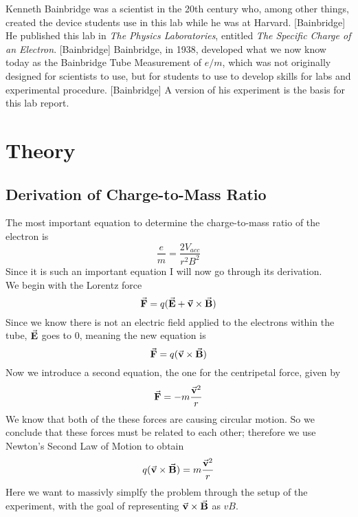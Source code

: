 \documentclass[aps,prl,10pt,twocolumn,floatfix]{revtex4-2}
\begin{document}
Kenneth Bainbridge was a scientist in the 20th century who, among other things, created the device students use in this lab while he was at Harvard. [Bainbridge]
He published this lab in \textit{The Physics Laboratories}, entitled \textit{The Specific Charge of an Electron}. [Bainbridge]
Bainbridge, in 1938, developed what we now know today as the Bainbridge Tube Measurement of $e/m$, which was not originally designed for scientists to use, but for students to use to develop skills for labs and experimental procedure. [Bainbridge]
A version of his experiment is the basis for this lab report.


\section{Theory}\label{Theory}
\subsection{Derivation of Charge-to-Mass Ratio}
The most important equation to determine the charge-to-mass ratio of the electron is
\begin{equation}\label{pears}
\frac{e}{m}=\frac{2V_{acc}}{r^2B^2}
\end{equation}
Since it is such an important equation I will now go through its derivation. \\
We begin with the Lorentz force
\begin{equation}
\va{F}=q(\va{E}+\va{v}\times \va{B})
\end{equation}
Since we know there is not an electric field applied to the electrons within the tube, $\va{E}$ goes to 0, meaning the new equation is
\begin{equation*}
\va{F}=q(\va{v}\times \va{B})
\end{equation*}
Now we introduce a second equation, the one for the centripetal force, given by
\begin{equation*}
\va{F}=-m\frac{\va{v}^2}{r}
\end{equation*}
We know that both of the these forces are causing circular motion.
So we conclude that these forces must be related to each other;
therefore we use Newton's Second Law of Motion to obtain 
\begin{equation}\label{apples}
q(\va{v}\times \va{B})=m\frac{\va{v}^2}{r}
\end{equation}
Here we want to massivly simplfy the problem through the setup of the experiment, with the goal of representing $\va{v}\times \va{B}$ as $vB$.
\end{document}
